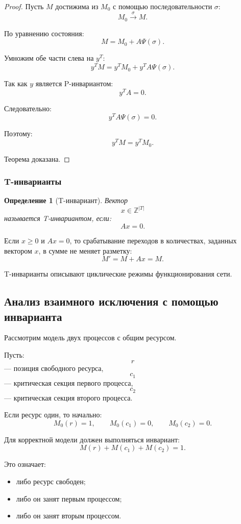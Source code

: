 \documentclass[12pt,a4paper]{article}
\newtheorem{definition}{Определение}
\begin{document}
\begin{proof}
Пусть $M$ достижима из $M_0$ с помощью последовательности $\sigma$:
\[
M_0 \xrightarrow{\sigma} M.
\]

По уравнению состояния:
\[
M = M_0 + A\Psi(\sigma).
\]

Умножим обе части слева на $y^T$:
\[
y^T M = y^T M_0 + y^T A\Psi(\sigma).
\]

Так как $y$ является P-инвариантом:
\[
y^T A = 0.
\]

Следовательно:
\[
y^T A\Psi(\sigma)=0.
\]

Поэтому:
\[
y^T M = y^T M_0.
\]

Теорема доказана.
\end{proof}

\subsubsection{T-инварианты}

\begin{definition}[T-инвариант]
Вектор
\[
x \in \mathbb{Z}^{|T|}
\]
называется T-инвариантом, если:
\[
Ax = 0.
\]
\end{definition}

Если $x \ge 0$ и $Ax=0$, то срабатывание переходов в количествах, заданных вектором $x$, в сумме не меняет разметку:
\[
M' = M + Ax = M.
\]

T-инварианты описывают циклические режимы функционирования сети.

\subsection{Анализ взаимного исключения с помощью инварианта}

Рассмотрим модель двух процессов с общим ресурсом.

Пусть:
\[
r
\]
--- позиция свободного ресурса,
\[
c_1
\]
--- критическая секция первого процесса,
\[
c_2
\]
--- критическая секция второго процесса.

Если ресурс один, то начально:
\[
M_0(r)=1,
\qquad
M_0(c_1)=0,
\qquad
M_0(c_2)=0.
\]

Для корректной модели должен выполняться инвариант:
\[
M(r)+M(c_1)+M(c_2)=1.
\]

Это означает:
\begin{itemize}
    \item либо ресурс свободен;
    \item либо он занят первым процессом;
    \item либо он занят вторым процессом.
\end{itemize}
\end{document}
